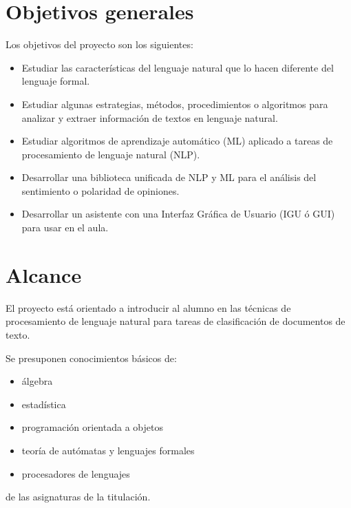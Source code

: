 


\section{Objetivos generales}

Los objetivos del proyecto son los siguientes:

\begin{itemize}
\item Estudiar las características del lenguaje natural que lo hacen diferente del lenguaje formal.
\item Estudiar algunas estrategias, métodos, procedimientos o algoritmos para analizar y extraer información de textos en lenguaje natural.
\item Estudiar algoritmos de aprendizaje automático (ML) aplicado a tareas de procesamiento de lenguaje natural (NLP).
\item Desarrollar una biblioteca unificada de NLP y ML para el análisis del sentimiento o polaridad de opiniones.
\item Desarrollar un asistente con una Interfaz Gráfica de Usuario (IGU ó GUI) para usar en el aula.
\end{itemize}

\section{Alcance}

El proyecto está orientado a introducir al alumno en las técnicas de procesamiento de lenguaje natural para tareas de clasificación de documentos de texto.

Se presuponen conocimientos básicos de:
\begin{itemize}
\item álgebra
\item estadística
\item programación orientada a objetos
\item teoría de autómatas y lenguajes formales
\item procesadores de lenguajes
\end{itemize}
de las asignaturas de la titulación.

